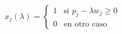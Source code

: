 \documentclass[preview]{standalone}
\begin{document}
\begin{align*}
x_j(\lambda) = \begin{cases}1 & \text{si } p_j - \lambda w_j \ge 0 \\ 0 & \text{en otro caso}\end{cases}
\end{align*}
\end{document}
